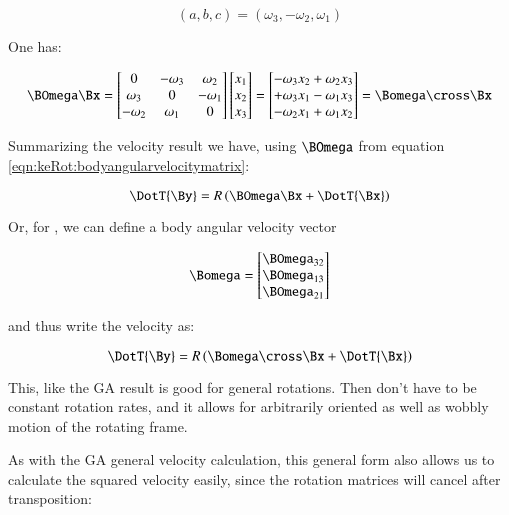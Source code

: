 \[
(a,b,c) = (\omega_3, -\omega_2, \omega_1)
\]

One has:

\[
\BOmega \Bx = 
\begin{bmatrix}
0 & -\omega_3 & \omega_2 \\
\omega_3 &  0 & -\omega_1 \\
-\omega_2 & \omega_1 &  0 \\
\end{bmatrix}
\begin{bmatrix}
x_1 \\
x_2 \\
x_3 \\
\end{bmatrix}
=
\begin{bmatrix}
-\omega_3 x_2 +\omega_2 x_3 \\
+\omega_3 x_1 -\omega_1 x_3 \\
-\omega_2 x_1 +\omega_1 x_2 \\
\end{bmatrix}
= \Bomega \cross \Bx
\]

Summarizing the velocity result we have, using $\BOmega$ from equation \ref{eqn:keRot:bodyangularvelocitymatrix}:

\begin{equation}
\DotT{\By} = R \left( \BOmega \Bx + \DotT{\Bx} \right)
\end{equation}

Or, for , we can define a body angular velocity vector

\begin{equation}
\Bomega = 
\begin{bmatrix}
\BOmega_{32} \\
\BOmega_{13} \\
\BOmega_{21} \\
\end{bmatrix}
\end{equation}

and thus write the velocity as:

\begin{equation}
\DotT{\By} = R \left( \Bomega \cross \Bx + \DotT{\Bx} \right)
\end{equation}

This, like the GA result is good for general rotations.  Then don't have to be constant
rotation rates, and it allows for arbitrarily
oriented as well as wobbly motion of the rotating frame.

As with the GA general velocity calculation, this general form also allows us to calculate
the squared velocity easily, since the rotation matrices will
cancel after transposition:

